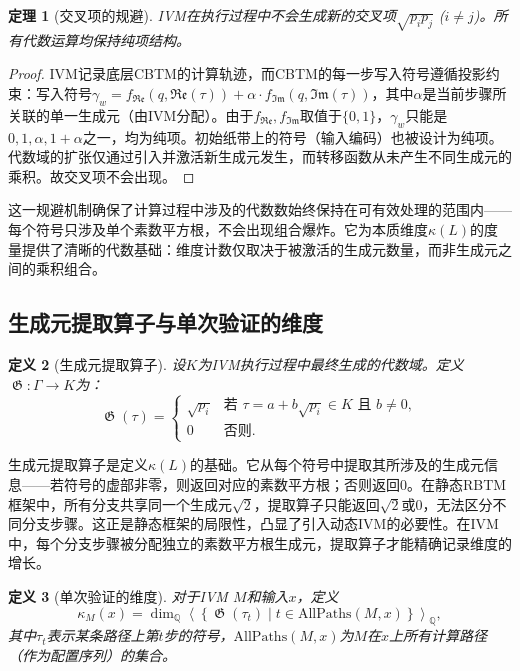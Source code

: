 \documentclass{ctexart}
\newtheorem{theorem}{定理}[section]
\newtheorem{definition}[theorem]{定义}
\newtheorem{proof}[theorem]{证明}
\begin{document}
	\begin{theorem}[交叉项的规避]\label{thm:cross-term}
		IVM在执行过程中不会生成新的交叉项$\sqrt{p_i p_j}$ ($i\neq j$)。所有代数运算均保持纯项结构。
	\end{theorem}
	\begin{proof}
		IVM记录底层CBTM的计算轨迹，而CBTM的每一步写入符号遵循投影约束：写入符号$\gamma_w = f_{\mathfrak{Re}}(q,\mathfrak{Re}(\tau)) + \alpha \cdot f_{\mathfrak{Im}}(q,\mathfrak{Im}(\tau))$，其中$\alpha$是当前步骤所关联的单一生成元（由IVM分配）。由于$f_{\mathfrak{Re}}, f_{\mathfrak{Im}}$取值于$\{0,1\}$，$\gamma_w$只能是$0,1,\alpha,1+\alpha$之一，均为纯项。初始纸带上的符号（输入编码）也被设计为纯项。代数域的扩张仅通过引入并激活新生成元发生，而转移函数从未产生不同生成元的乘积。故交叉项不会出现。
	\end{proof}
	
	这一规避机制确保了计算过程中涉及的代数数始终保持在可有效处理的范围内——每个符号只涉及单个素数平方根，不会出现组合爆炸。它为本质维度$\kappa(L)$的度量提供了清晰的代数基础：维度计数仅取决于被激活的生成元数量，而非生成元之间的乘积组合。
	
	\subsection{生成元提取算子与单次验证的维度}
	
	\begin{definition}[生成元提取算子]\label{def:generator-extraction}
		设$K$为IVM执行过程中最终生成的代数域。定义$\operatorname{\mathfrak{G}}:\Gamma\to K$为：
		\[
		\operatorname{\mathfrak{G}}(\tau)=\begin{cases}
			\sqrt{p_i} & \text{若 }\tau = a + b\sqrt{p_i}\in K\text{ 且 }b\neq0,\\
			0 & \text{否则}.
		\end{cases}
		\]
	\end{definition}
	
	生成元提取算子是定义$\kappa(L)$的基础。它从每个符号中提取其所涉及的生成元信息——若符号的虚部非零，则返回对应的素数平方根；否则返回$0$。在静态RBTM框架中，所有分支共享同一个生成元$\sqrt{2}$，提取算子只能返回$\sqrt{2}$或$0$，无法区分不同分支步骤。这正是静态框架的局限性，凸显了引入动态IVM的必要性。在IVM中，每个分支步骤被分配独立的素数平方根生成元，提取算子才能精确记录维度的增长。
	
	\begin{definition}[单次验证的维度]\label{def:single-dim}
		对于IVM $M$和输入$x$，定义
		\[
		\kappa_M(x) = \dim_{\mathbb{Q}}\left\langle \left\{ \operatorname{\mathfrak{G}}(\tau_t) \mid t\in\mathrm{AllPaths}(M,x)  \right\} \right\rangle_{\mathbb{Q}},
		\]
		其中$\tau_t$表示某条路径上第$t$步的符号，$\mathrm{AllPaths}(M,x)$为$M$在$x$上所有计算路径（作为配置序列）的集合。
	\end{definition}
	
\end{document}
